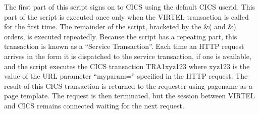 \documentclass[letterpaper,10pt,english]{sphinxmanual}
\begin{document}
\begin{sphinxVerbatim}[commandchars=\\\{\}]
                          
                         
      
                      
                          
                                 
     
         
\end{sphinxVerbatim}


The first part of this script signs on to CICS using the default CICS userid. This part of the script is executed once only when the VIRTEL transaction is called for the first time. The remainder of the script, bracketed by the \&( and \&) orders, is executed repeatedly. Because the script has a repeating part, this transaction is known as a “Service Transaction”. Each time an HTTP request arrives in the form  it is dispatched to the service transaction, if one is available, and the script executes the CICS transaction TRA1xyz123 where xyz123 is the value of the URL parameter “myparam=” specified in the HTTP request. The result of this CICS transaction is returned to the requester using pagename as a page template. The request is then terminated, but the session between VIRTEL and CICS remains connected waiting for the next request.
\end{document}
